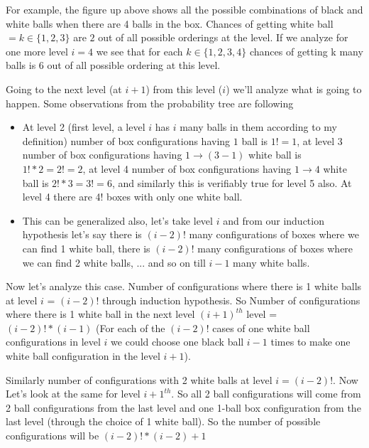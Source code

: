 \documentclass[addpoints,12pt]{exam}
\begin{document}
\begin{questions}
\begin{solution}
            For example, the figure up above shows all the possible combinations of black and white balls when there are 4 balls in the box. Chances of getting white ball $= k \in \{1,2,3\}$ are $2$ out of all possible orderings at the level. If we analyze for one more level $i = 4$ we see that for each $k \in \{1,2,3,4\}$ chances of getting k many balls is $6$ out of all possible ordering at this level.

            Going to the next level (at $i+1$) from this level ($i$) we'll analyze what is going to happen. Some observations from the probability tree are following

            \begin{itemize}
                \item At level 2 (first level, a level $i$ has $i$ many balls in them according to my definition) number of box configurations having $1$ ball is $1! = 1$, at level 3 number of box configurations having $1 \to (3-1)$ white ball is $1! * 2 = 2! = 2$, at level 4 number of box configurations having $1 \to 4$ white ball is $2! * 3 = 3! = 6$, and similarly this is verifiably true for level 5 also. At level 4 there are 4! boxes with only one white ball.
                \item This can be generalized also, let's take level $i$ and from our induction hypothesis let's say there is $(i-2)!$ many configurations of boxes where we can find 1 white ball, there is $(i-2)!$ many configurations of boxes where we can find 2 white balls, ... and so on till $i - 1$ many white balls.
                
            \end{itemize}

            Now let's analyze this case. Number of configurations where there is 1 white balls at level $i$ = $(i-2)!$ through induction hypothesis. So Number of configurations where there is 1 white ball in the next level $(i + 1)^{th}$ level = $(i-2)! * (i-1)$ (For each of the $(i-2)!$ cases of one white ball configurations in level $i$ we could choose one black ball $i-1$ times to make one white ball configuration in the level $i+1$).

            Similarly number of configurations with 2 white balls at level $i = (i-2)!$. Now Let's look at the same for level $i+1^{th}$. So all 2 ball configurations will come from 2 ball configurations from the last level and one 1-ball box configuration from the last level (through the choice of 1 white ball). So the number of possible configurations will be $(i-2)! * (i-2) + 1$


\end{solution}
\end{questions}
\end{document}

